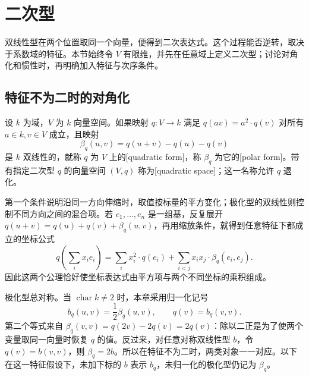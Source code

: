 
\section{二次型}
\label{b2:sec:1002}

双线性型在两个位置取同一个向量，便得到二次表达式。这个过程能否逆转，取决于系数域的特征。本节始终令 \(V\) 有限维，并先在任意域上定义二次型；讨论对角化和惯性时，再明确加入特征与次序条件。

%
%

\subsection{特征不为二时的对角化}
\label{b2:subsec:1002:01}

\begin{definition}\label{b2:def:quadratic-form}
	设 \(k\) 为域，\(V\) 为 \(k\) 向量空间。如果映射 \(q:V\to k\) 满足 \(q(av)=a^2\cdot q(v)\) 对所有 \(a\in k,v\in V\) 成立，且映射
	\begin{equation}\label{b2:eq:quadratic-polar}
		\beta_q(u,v)=q(u+v)-q(u)-q(v)
	\end{equation}
	是 \(k\) 双线性的，就称 \(q\) 为 \(V\) 上的[quadratic form]，称 \(\beta_q\) 为它的[polar form]。带有指定二次型 \(q\) 的向量空间 \((V,q)\) 称为[quadratic space]；这一名称允许 \(q\) 退化。
\end{definition}

第一个条件说明沿同一方向伸缩时，取值按标量的平方变化；极化型的双线性则控制不同方向之间的混合项。若 \(e_1,\ldots,e_n\) 是一组基，反复展开 \(q(u+v)=q(u)+q(v)+\beta_q(u,v)\)，再用缩放条件，就得到任意特征下都成立的坐标公式
\[
	q\left(\sum_i x_ie_i\right) =\sum_i x_i^2\cdot q(e_i) +\sum_{i<j}x_ix_j\cdot\beta_q(e_i,e_j).
\]
因此这两个公理恰好使坐标表达式由平方项与两个不同坐标的乘积组成。

\ProseParagraphBreak
极化型总对称。当 \(\operatorname{char}k\ne2\) 时，本章采用归一化记号
\begin{equation}\label{b2:eq:normalized-polar}
	b_q(u,v)=\frac12\beta_q(u,v),\qquad q(v)=b_q(v,v).
\end{equation}
第二个等式来自 \(\beta_q(v,v)=q(2v)-2q(v)=2q(v)\)：除以二正是为了使两个变量取同一向量时恢复 \(q\) 的值。反过来，对任意对称双线性型 \(b\)，令 \(q(v)=b(v,v)\)，则 \(\beta_q=2b\)。所以在特征不为二时，两类对象一一对应。以下在这一特征假设下，未加下标的 \(b\) 表示 \(b_q\)，未归一化的极化型仍记为 \(\beta_q\)。


